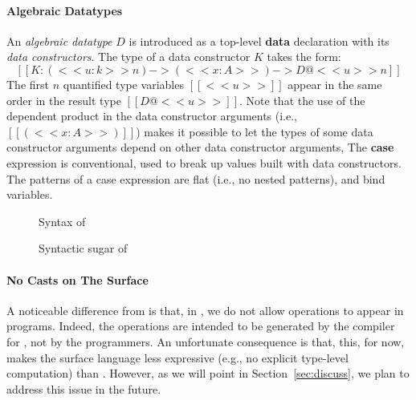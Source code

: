 \paragraph{Algebraic Datatypes}
An \emph{algebraic datatype} $D$ is introduced as a top-level
\textbf{data} declaration with its \emph{data constructors}. The type
of a data constructor $K$ takes the form:
\[
[[K : (<<u:k>>n) -> (<<x : A>>) -> D@<<u>>n]]
\]
The first $n$ quantified type variables $[[<<u>>]]$ appear in the same
order in the result type $[[D@<<u>>]]$.  Note that the use of the
dependent product in the data constructor arguments (i.e.,
$[[(<<x:A>>)]]$) makes it possible to let the types of some data
constructor arguments depend on other data constructor arguments,
The \textbf{case} expression is conventional, used to break up values
built with data constructors.  The patterns of a case expression are
flat (i.e., no nested patterns), and bind variables.

{
\renewcommand{\arraystretch}{0.9}
\begin{figure}
\resizebox{\columnwidth}{!}{\gram{\ottpgm\ottinterrule
\ottdecl\ottinterrule
\ottu\ottinterrule
\ottp\ottinterrule
\ottE\ottinterrule
\ottGs}}
\caption{Syntax of \sufcc}
\label{fig:surface:syntax}
\end{figure}

\begin{figure}
\resizebox{\columnwidth}{!}{$\ottsurfsugar$} %
\caption{Syntactic sugar of \sufcc}
\label{fig:surface:sugar}
\end{figure}
}

\paragraph{No Casts on The Surface}
A noticeable difference from \name is that, in \sufcc, we do not allow
\cast operations to appear in programs. Indeed, the \cast
operations are intended to be generated by the compiler for \name, not
by the programmers. An unfortunate consequence is that, this, for now,
makes the surface language less expressive (e.g., no explicit
type-level computation) than \name. However, as we will point in
Section~\ref{sec:discuss}, we plan to address this issue in the future.

